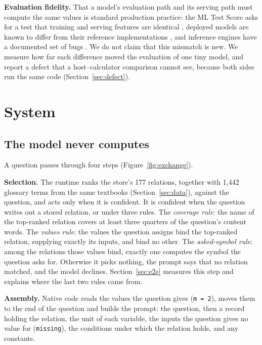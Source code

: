 \documentclass[10pt]{article}
\newcommand{\tok}[1]{\texttt{\small #1}}
\begin{document}
\textbf{Evaluation fidelity.} That a model's evaluation path and its serving path must compute the
same values is standard production practice: the ML Test Score asks for a test that training and
serving features are identical \citep{breck2017mltestscore}, deployed models are known to differ from
their reference implementations \citep{qiu2022mlexray}, and inference engines have a documented set
of bugs \citep{liu2025first}. We do not claim that this mismatch is new. We measure how far each
difference moved the evaluation of one tiny model, and report a defect that a host--calculator
comparison cannot see, because both sides run the same code (Section~\ref{sec:defect}).

\section{System}
\label{sec:arch}

\subsection{The model never computes}

A question passes through four steps (Figure~\ref{fig:exchange}).

\textbf{Selection.} The runtime ranks the store's 177 relations, together with 1,442 glossary terms
from the same textbooks (Section~\ref{sec:data}), against the question, and acts only when it is
confident. It is confident when the question writes out a stored relation, or under three rules.
The \emph{coverage rule}: the name of the top-ranked relation covers at least three quarters of the
question's content words. The \emph{values rule}: the values the question assigns bind the
top-ranked relation, supplying exactly its inputs, and bind no other. The \emph{asked-symbol rule}:
among the relations those values bind, exactly one computes the symbol the question asks for.
Otherwise it picks nothing, the prompt says that no relation matched, and the model declines.
Section~\ref{sec:e2e} measures this step and explains where the last two
rules came from.

\textbf{Assembly.} Native code reads the values the question gives (\tok{m = 2}), moves them to the end of
the question and builds the prompt: the question, then a record holding the relation, the unit of each
variable, the inputs the question gives no value for (\tok{missing}), the conditions under which the relation holds,
and any constants.
\end{document}
